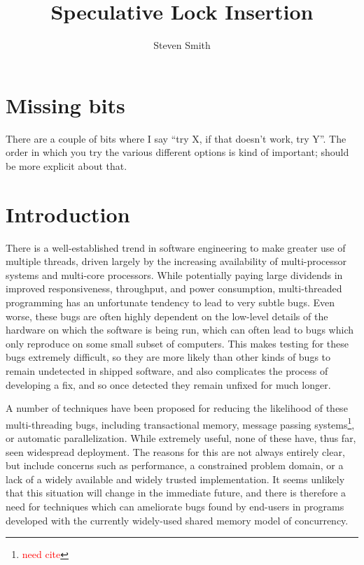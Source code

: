 \documentclass[10pt,a4paper,twocolumn]{article}
\title{Speculative Lock Insertion}
\author{Steven Smith}
\begin{document}
\newcommand{\editorial}[1]{\textcolor{red}{\footnote{\textcolor{red}{#1}}}}
\newcommand{\needCite}{\editorial{need cite}}
\maketitle

\section{Missing bits}

There are a couple of bits where I say ``try X, if that doesn't work,
try Y''.  The order in which you try the various different options is
kind of important; should be more explicit about that.

\section{Introduction}

There is a well-established trend in software engineering to make
greater use of multiple threads, driven largely by the increasing
availability of multi-processor systems and multi-core processors.
While potentially paying large dividends in improved responsiveness,
throughput, and power consumption, multi-threaded programming has an
unfortunate tendency to lead to very subtle bugs.  Even worse, these
bugs are often highly dependent on the low-level details of the
hardware on which the software is being run, which can often lead to
bugs which only reproduce on some small subset of computers.  This
makes testing for these bugs extremely difficult, so they are more
likely than other kinds of bugs to remain undetected in shipped
software, and also complicates the process of developing a fix, and so
once detected they remain unfixed for much longer.

A number of techniques have been proposed for reducing the likelihood
of these multi-threading bugs, including transactional
memory\cite{Shavit1997}, message passing systems\needCite{}, or
automatic parallelization\cite{Bacon1994}.  While extremely useful,
none of these have, thus far, seen widespread deployment.  The reasons
for this are not always entirely clear, but include concerns such as
performance, a constrained problem domain, or a lack of a widely
available and widely trusted implementation.  It seems unlikely that
this situation will change in the immediate future, and there is
therefore a need for techniques which can ameliorate bugs found by
end-users in programs developed with the currently widely-used shared
memory model of concurrency.
\end{document}
